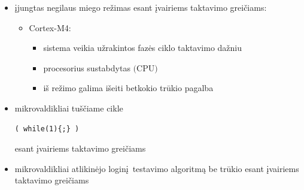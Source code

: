 \documentclass[a4paper, 12pt]{article} %
\begin{document}
\begin{onehalfspacing}
\begin{itemize}
\begin{itemize}
\begin{itemize}
\begin{itemize}
\end{itemize} 
\end{itemize}
\item 
\end{itemize}
\item \k{i}jungtas negilaus miego re\v{z}imas esant \k{i}vairiems taktavimo grei\v{c}iams:
\begin{itemize} %
\item Cortex-M4:
\begin{itemize}
\item sistema veikia u\v{z}rakintos faz\.es ciklo taktavimo da\v{z}niu
\item procesorius sustabdytas $($CPU$)$
\item i\v{s} re\v{z}imo galima i\v{s}eiti betkokio tr\=ukio pagalba
\end{itemize}
\end{itemize}
\item mikrovaldikliai tu\v{s}\v{c}iame cikle \begin{verbatim}( while(1){;} )\end{verbatim}esant \k{i}vairiems taktavimo grei\v{c}iams
\item mikrovaldikliai atlikin\.ejo login\k{i}\ testavimo algoritm\k{a} be tr\=ukio esant \k{i}vairiems taktavimo grei\v{c}iams  
\end{itemize}

\newpage
   

\end{onehalfspacing}
\end{document}
